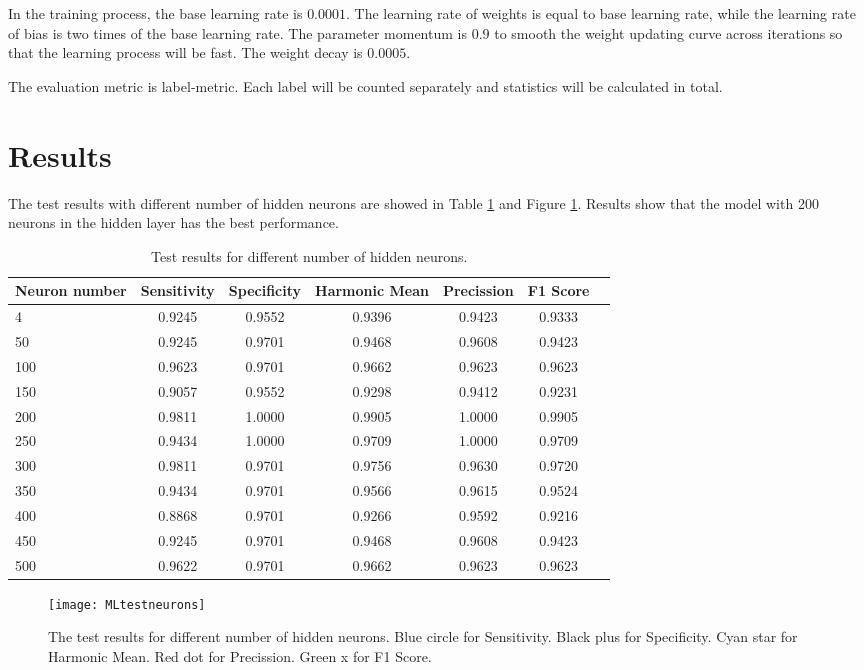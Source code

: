 In the training process, the base learning rate is $0.0001$. The learning rate of weights is equal to base learning rate, while the learning rate of bias is two times of the base learning rate. The parameter momentum is $0.9$ to smooth the weight updating curve across iterations so that the learning process will be fast. The weight decay is $0.0005$.

The evaluation metric is label-metric. Each label will be counted separately and statistics will be calculated in total.

\section{Results}

The test results with different number of hidden neurons are showed in Table \ref{tb:tMLtestneurons} and Figure \ref{fig:MLtestneurons}. Results show that the model with 200 neurons in the hidden layer has the best performance.
\begin{table}
\centering
\begin{tabular}{l*{6}{c}}
Neuron number              & Sensitivity & Specificity & Harmonic Mean & Precission & F1 Score  \\
\hline
4 				& 0.9245 & 0.9552 & 0.9396 & 0.9423 & 0.9333   \\
50              & 0.9245 & 0.9701 & 0.9468 & 0.9608 & 0.9423   \\
100             & 0.9623 & 0.9701 & 0.9662 & 0.9623 &  0.9623  \\
150             & 0.9057 & 0.9552 & 0.9298 & 0.9412 &  0.9231   \\
200             & 0.9811 & 1.0000 & 0.9905 & 1.0000 &  0.9905   \\
250             & 0.9434 & 1.0000 & 0.9709 & 1.0000 &  0.9709   \\
300             & 0.9811 & 0.9701 & 0.9756 & 0.9630 &  0.9720   \\
350             & 0.9434 & 0.9701 & 0.9566 & 0.9615 &  0.9524   \\
400             & 0.8868 & 0.9701 & 0.9266 & 0.9592 &  0.9216   \\
450             & 0.9245 & 0.9701 & 0.9468 & 0.9608 &  0.9423   \\
500             & 0.9622 & 0.9701 & 0.9662 & 0.9623 &  0.9623   \\
\end{tabular}
\caption{\label{tb:tMLtestneurons}Test results for different number of hidden neurons.}
\end{table}
\begin{figure}[htb]
\centering
\texttt{[image: MLtestneurons]}
\caption{\label{fig:MLtestneurons}The test results for different number of hidden neurons. Blue circle for Sensitivity. Black plus for Specificity. Cyan star for Harmonic Mean. Red dot for Precission. Green x for F1 Score.}
\end{figure}


